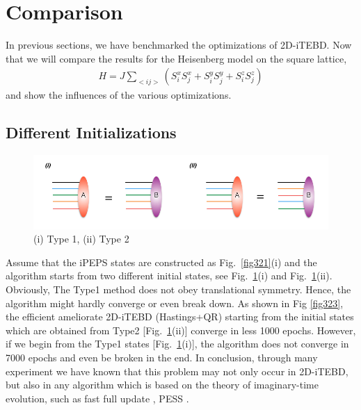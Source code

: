 \section{Comparison} 
\label{Comparison}

In previous sections, we have benchmarked the optimizations of 2D-iTEBD. Now that we will compare the results for the Heisenberg model on the square lattice,
\begin{align}
	\label{mapgroud}
	H = J \sum_{<ij>}{\left( S^{x}_{i}S^{x}_{j}+S^{y}_{i}S^{y}_{j}+S^{z}_{i}S^{z}_{j} \right)}
\end{align}
and show the influences of the various optimizations.

\subsection{Different Initializations}

\begin{figure}[ht]
	\centering
	\includegraphics[width=1.00\textwidth]{figures/fig322.png}
	\caption[Different methods to initialize the states]{(i) Type 1, (ii) Type 2}
	\label{fig322}
\end{figure}

Assume that the iPEPS states are constructed as Fig.~\ref{fig321}(i) and the algorithm starts from two different initial states, see Fig.~\ref{fig322}(i) and Fig.~\ref{fig322}(ii). Obviously, The Type1 method does not obey translational symmetry. Hence, the algorithm might hardly converge or even break down. As shown in Fig \ref{fig323}, the efficient ameliorate 2D-iTEBD (Hastings+QR) starting from the initial states which are obtained from Type2 [Fig.~\ref{fig322}(ii)] converge in less 1000 epochs. However, if we begin from the Type1 states [Fig.~\ref{fig322}(i)], the algorithm does not converge in 7000 epochs and even be broken in the end. 
In conclusion, through many experiment we have known that this problem may not only occur in 2D-iTEBD, but also in any algorithm which is based on the theory of imaginary-time evolution, such as fast full update \cite{PhysRevB.92.035142}, PESS \cite{PhysRevX.4.011025}.


